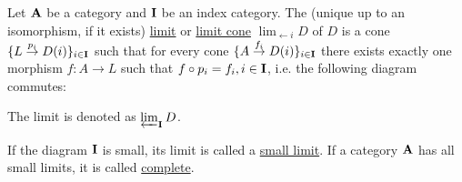 \begin{definition}\label{def:categorical_limit}\cite[definitions 5.1.19(b), definition 6.3.6]{Leinster2014}
  Let $\operatorname{\mathbf{A}}$ be a category and $\operatorname{\mathbf{I}}$ be an index category. The (unique up to an isomorphism, if it exists) \uline{limit} or \uline{limit cone} $\displaystyle\lim_{\leftarrow i} D$ of $D$ is a cone $\{ L \overset {p_i} \to D(i) \}_{i \in \operatorname{\mathbf{I}}}$ such that for every cone $\{ A \overset {f_i} \to D(i) \}_{i \in \operatorname{\mathbf{I}}}$ there exists exactly one morphism $f: A \to L$ such that $f \circ p_i = f_i, i \in \operatorname{\mathbf{I}}$, i.e. the following diagram commutes:
  \begin{center}
  \end{center}

  The limit is denoted as $\varprojlim_{\operatorname{\mathbf{I}}} D$.

  If the diagram $\operatorname{\mathbf{I}}$ is small, its limit is called a \uline{small limit}. If a category $\operatorname{\mathbf{A}}$ has all small limits, it is called \uline{complete}.
\end{definition}


